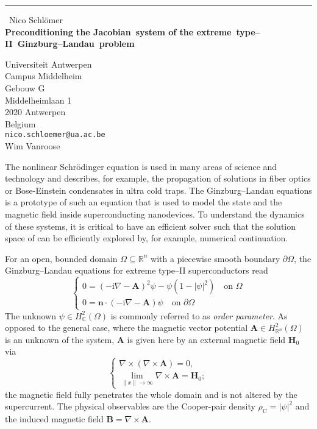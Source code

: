 \documentclass{report}
\begin{document}
\begin{center}
\rule{6in}{1pt} \
{\large Nico Schl\"omer \\
{\bf Preconditioning the Jacobian~system of the extreme~type--II~Ginzburg--Landau~problem}}

Universiteit Antwerpen \\ Campus Middelheim \\ Gebouw G \\ Middelheimlaan 1 \\ 2020 Antwerpen \\ Belgium
\\
{\tt nico.schloemer@ua.ac.be}\\
Wim Vanroose\end{center}

The nonlinear Schr\"odinger equation is used in many areas of science
and technology and describes, for example, the propagation of
solutions in fiber optics or Bose-Einstein condensates in ultra cold
traps. The Ginzburg--Landau equations is a prototype of such an
equation that is used to model the state and the magnetic field inside
superconducting nanodevices. To understand the dynamics of these
systems, it is critical to have an efficient solver such
that the solution space of can be efficiently explored by, for
example, numerical continuation.

For an open, bounded domain $\Omega\subseteq\mathbb{R}^n$ with a
piecewise smooth boundary
$\partial\Omega$, the Ginzburg--Landau equations for extreme type--II
superconductors read
\begin{equation}\label{eq:GL}
\begin{cases}
0 = \left(-\text{i}\nabla - \mathbf{A}\right)^2 \psi - \psi \left(1 -
|\psi|^2\right) \quad \text{on } \Omega \\[3mm]
0 = \mathbf{n} \cdot ( -\text{i}\nabla - \mathbf{A}) \psi \quad \text{on } \partial\Omega
\end{cases}
\end{equation}
The unknown $\psi\in H^2_{\mathbb{C}}(\Omega)$ is commonly referred to as
\emph{order parameter}.
As opposed to the general case, where the magnetic vector potential
$\mathbf{A}\in H_{\mathbb{R}^n}^2(\Omega)$ is an
unknown of the system, $\mathbf{A}$ is given here by an external magnetic field
$\mathbf{H}_0$ via
\[
\begin{cases}
\nabla\times(\nabla\times \mathbf{A}) = 0,\\
\lim\limits_{\|x\|\to\infty} \nabla\times\mathbf{A} = \mathbf{H}_0;
\end{cases}
\]
the magnetic field fully penetrates the whole domain and is not altered
by the supercurrent.
The physical observables are the Cooper-pair density
$\rho_{\text{C}}=|\psi|^2$ and the induced magnetic field
$\mathbf{B}=\nabla\times\mathbf{A}$.
\end{document}
